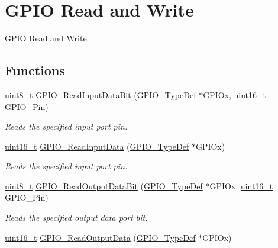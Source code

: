 \hypertarget{group___g_p_i_o___group2}{\section{G\-P\-I\-O Read and Write}
\label{group___g_p_i_o___group2}
}


G\-P\-I\-O Read and Write.  


\subsection*{Functions}
\begin{DoxyCompactItemize}
\item 
\hyperlink{stdint_8h_aba7bc1797add20fe3efdf37ced1182c5}{uint8\-\_\-t} \hyperlink{group___g_p_i_o___group2_ga98772ef6b639b3fa06c8ae5ba28d3aaa}{G\-P\-I\-O\-\_\-\-Read\-Input\-Data\-Bit} (\hyperlink{struct_g_p_i_o___type_def}{G\-P\-I\-O\-\_\-\-Type\-Def} $\ast$G\-P\-I\-Ox, \hyperlink{stdint_8h_a273cf69d639a59973b6019625df33e30}{uint16\-\_\-t} G\-P\-I\-O\-\_\-\-Pin)
\begin{DoxyCompactList}\small\item\em Reads the specified input port pin. \end{DoxyCompactList}\item 
\hyperlink{stdint_8h_a273cf69d639a59973b6019625df33e30}{uint16\-\_\-t} \hyperlink{group___g_p_i_o___group2_ga139a33adc8409288e9f193bbebb5a0f7}{G\-P\-I\-O\-\_\-\-Read\-Input\-Data} (\hyperlink{struct_g_p_i_o___type_def}{G\-P\-I\-O\-\_\-\-Type\-Def} $\ast$G\-P\-I\-Ox)
\begin{DoxyCompactList}\small\item\em Reads the specified input port pin. \end{DoxyCompactList}\item 
\hyperlink{stdint_8h_aba7bc1797add20fe3efdf37ced1182c5}{uint8\-\_\-t} \hyperlink{group___g_p_i_o___group2_ga138270f8695b105b7c6ed405792919c1}{G\-P\-I\-O\-\_\-\-Read\-Output\-Data\-Bit} (\hyperlink{struct_g_p_i_o___type_def}{G\-P\-I\-O\-\_\-\-Type\-Def} $\ast$G\-P\-I\-Ox, \hyperlink{stdint_8h_a273cf69d639a59973b6019625df33e30}{uint16\-\_\-t} G\-P\-I\-O\-\_\-\-Pin)
\begin{DoxyCompactList}\small\item\em Reads the specified output data port bit. \end{DoxyCompactList}\item 
\hyperlink{stdint_8h_a273cf69d639a59973b6019625df33e30}{uint16\-\_\-t} \hyperlink{group___g_p_i_o___group2_gaf8938a34280b7dc3e39872a7c17bb323}{G\-P\-I\-O\-\_\-\-Read\-Output\-Data} (\hyperlink{struct_g_p_i_o___type_def}{G\-P\-I\-O\-\_\-\-Type\-Def} $\ast$G\-P\-I\-Ox)

\end{DoxyCompactItemize}
